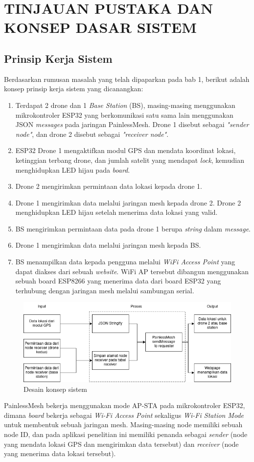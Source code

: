 \chapter{TINJAUAN PUSTAKA DAN KONSEP DASAR SISTEM}

\section{Prinsip Kerja Sistem}
Berdasarkan rumusan masalah yang telah dipaparkan pada bab 1, berikut adalah konsep prinsip kerja sistem yang dicanangkan:
\begin{enumerate}
	\item Terdapat 2 drone dan 1 \textit{Base Station} (BS), masing-masing menggunakan mikrokontroler ESP32 yang berkomunikasi satu sama lain menggunakan JSON \textit{messages} pada jaringan PainlessMesh. Drone 1 disebut sebagai \textit{"sender node"}, dan drone 2 disebut sebagai \textit{"receiver node"}.
	\item ESP32 Drone 1 mengaktifkan modul GPS dan mendata koordinat lokasi, ketinggian terbang drone, dan jumlah satelit yang mendapat \textit{lock}, kemudian menghidupkan LED hijau pada \textit{board}.
	\item Drone 2 mengirimkan permintaan data lokasi kepada drone 1.
	\item Drone 1 mengirimkan data melalui jaringan mesh kepada drone 2. Drone 2 menghidupkan LED hijau setelah menerima data lokasi yang valid.
	\item BS mengirimkan permintaan data pada drone 1 berupa \textit{string} dalam \textit{message}.
	\item Drone 1 mengirimkan data melalui jaringan mesh kepada BS.
	\item BS menampilkan data kepada pengguna melalui \textit{WiFi Access Point} yang dapat diakses dari sebuah \textit{website}. WiFi AP tersebut dibangun menggunakan sebuah board ESP8266 yang menerima data dari board ESP32 yang terhubung dengan jaringan mesh melalui sambungan serial.
\end{enumerate}
\begin{figure}[h]
	\includegraphics[scale=0.60]{./assets/IOProses}
	\caption{Desain konsep sistem}
\end{figure}
PainlessMesh bekerja menggunakan mode AP-STA pada mikrokontroler ESP32, dimana \textit{board} bekerja sebagai \textit{Wi-Fi Access Point} sekaligus \textit{Wi-Fi Station Mode} untuk membentuk sebuah jaringan mesh. Masing-masing node memiliki sebuah node ID, dan pada aplikasi penelitian ini memiliki penanda sebagai \textit{sender} (node yang mendata lokasi GPS dan mengirimkan data tersebut) dan \textit{receiver} (node yang menerima data lokasi tersebut).

